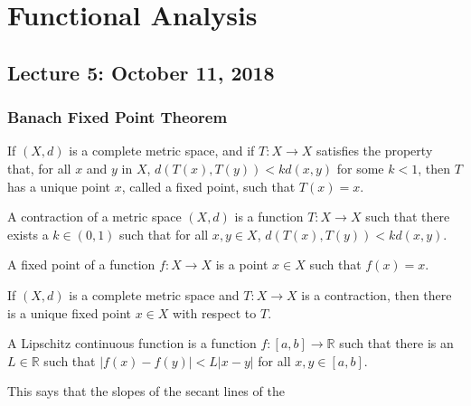 \documentclass[crop=false,class=article,oneside]{standalone}
\begin{document}
    \ifx\ifmathcoursesfunctional\undefined
        \section*{Functional Analysis}
        \setcounter{section}{1}
    \fi
    \subsection{Lecture 5: October 11, 2018}
        \subsubsection{Banach Fixed Point Theorem}
            If $(X,d)$ is a complete metric space,
            and if $T:X\rightarrow{X}$ satisfies
            the property that, for all $x$ and $y$
            in $X$, $d(T(x),T(y))<kd(x,y)$ for
            some $k<1$, then $T$ has a unique
            point $x$, called a fixed point,
            such that $T(x)=x$.
            \begin{definition}
                A contraction of a metric
                space $(X,d)$ is a function
                $T:{X}\rightarrow{X}$ such that there
                exists a $k\in(0,1)$ such that
                for all $x,y\in{X}$,
                $d(T(x),T(y))<kd(x,y)$.
            \end{definition}
            \begin{definition}
                A fixed point of a function
                $f:X\rightarrow{X}$ is a point
                $x\in{X}$ such that
                $f(x)=x$.
            \end{definition}
            \begin{theorem}
                If $(X,d)$ is a complete
                metric space and $T:X\rightarrow{X}$
                is a contraction, then there is
                a unique fixed point $x\in{X}$
                with respect to $T$.
            \end{theorem}
            \begin{definition}
                A Lipschitz continuous function is a
                function $f:[a,b]\rightarrow\mathbb{R}$
                such that there is an $L\in\mathbb{R}$
                such that
                $|f(x)-f(y)|<L|x-y|$ for all
                $x,y\in[a,b]$.
            \end{definition}
            This says that the slopes of the
            secant lines of the
\end{document}
